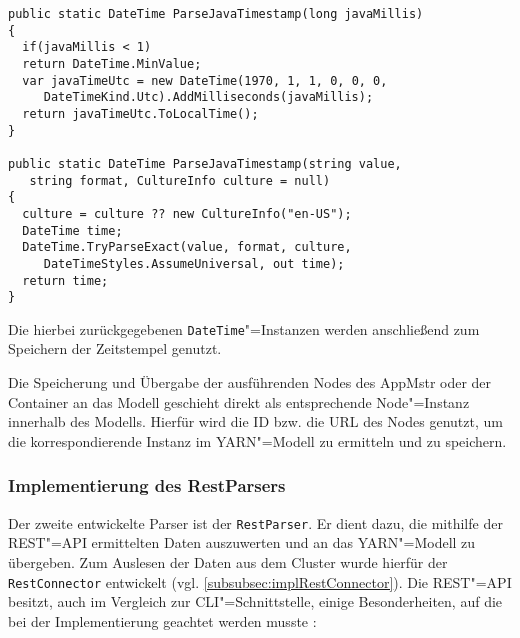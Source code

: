 \begin{lstlisting}[label=lst:parseJavaTimestamp,style=cs,
caption={[Überladungen der Methode ParseJavaTimestamp()]
    Überladungen der Methode \texttt{ParseJavaTimestamp()}.
    Es steht zudem eine weitere Überladung zur Verfügung, um den Timestamp in Form der Millisekunden seit 1970 als \texttt{string} zu übergeben.
    Dabei wird der \texttt{string} in einen \texttt{long} konvertiert und anschließend die erste hier gezeigte Überladung aufgerufen.}]
public static DateTime ParseJavaTimestamp(long javaMillis)
{
  if(javaMillis < 1)
  return DateTime.MinValue;
  var javaTimeUtc = new DateTime(1970, 1, 1, 0, 0, 0,
     DateTimeKind.Utc).AddMilliseconds(javaMillis);
  return javaTimeUtc.ToLocalTime();
}

public static DateTime ParseJavaTimestamp(string value,
   string format, CultureInfo culture = null)
{
  culture = culture ?? new CultureInfo("en-US");
  DateTime time;
  DateTime.TryParseExact(value, format, culture,
     DateTimeStyles.AssumeUniversal, out time);
  return time;
}
\end{lstlisting}

Die hierbei zurückgegebenen \texttt{DateTime}"=Instanzen werden anschließend zum Speichern der Zeitstempel genutzt.

Die Speicherung und Übergabe der ausführenden Nodes des \gls{AppMstr} oder der Container an das Modell geschieht direkt als entsprechende Node"=Instanz innerhalb des Modells.
Hierfür wird die ID bzw. die URL des Nodes genutzt, um die korrespondierende Instanz im YARN"=Modell zu ermitteln und zu speichern.

\subsubsection{Implementierung des RestParsers}
\label{subsubsec:implRestParser}

Der zweite entwickelte Parser ist der \texttt{RestParser}.
Er dient dazu, die mithilfe der REST"=API ermittelten Daten auszuwerten und an das YARN"=Modell zu übergeben.
Zum Auslesen der Daten aus dem Cluster wurde hierfür der \texttt{RestConnector} entwickelt (vgl. \cref{subsubsec:implRestConnector}).
Die REST"=API besitzt, auch im Vergleich zur \gls{CLI}"=Schnittstelle, einige Besonderheiten, auf die bei der Implementierung geachtet werden musste \cite{HadoopYarnCmds271,HadoopRmApi271,HadoopNmApi271,HadoopYarnTlServer271}:

